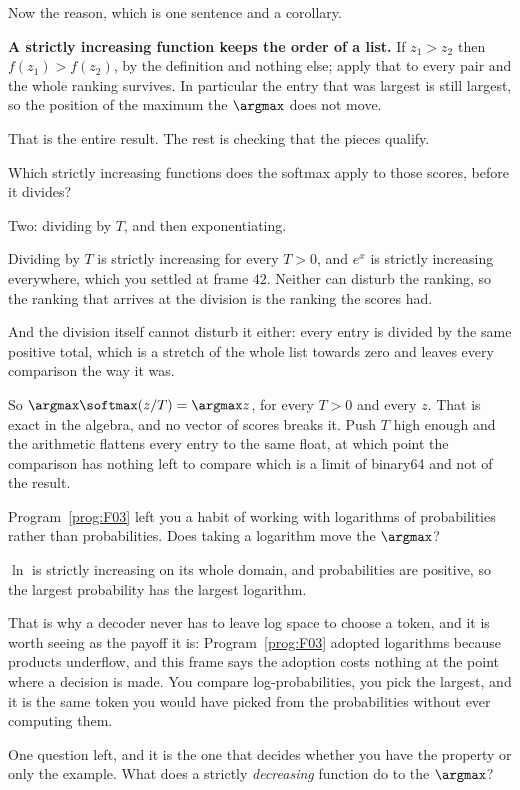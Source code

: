 \begin{fr}
Now the reason, which is one sentence and a corollary.

\textbf{A strictly increasing function keeps the order of a list.} If
$z_1 > z_2$ then $f(z_1) > f(z_2)$, by the definition and nothing else; apply
that to every pair and the whole ranking survives. In particular the entry that
was largest is still largest, so the position of the maximum \dash{} the
$\argmax$ \dash{} does not move.

That is the entire result. The rest is checking that the pieces qualify.

Which strictly increasing functions does the softmax apply to those scores,
before it divides?
\nextframe
\end{fr}

\begin{fr}
\begin{ansblock}
Two: dividing by $T$, and then exponentiating.
\end{ansblock}

Dividing by $T$ is strictly increasing for every $T > 0$, and $e^{x}$ is
strictly increasing everywhere, which you settled at frame $42$. Neither can
disturb the ranking, so the ranking that arrives at the division is the ranking
the scores had.

And the division itself cannot disturb it either: every entry is divided by the
same positive total, which is a stretch of the whole list towards zero and
leaves every comparison the way it was.

So $\argmax \softmax(z / T) = \argmax z$, for every $T > 0$ and every $z$. That
is exact in the algebra, and no vector of scores breaks it. Push $T$ high
enough and the arithmetic flattens every entry to the same float, at which
point the comparison has nothing left to compare \dash{} which is a limit of
binary64 and not of the result.

Program~\ref{prog:F03} left you a habit of working with logarithms of
probabilities rather than probabilities. Does taking a logarithm move the
$\argmax$?
\nextframe
\end{fr}

\begin{fr}
$\ln$ is strictly increasing on its whole domain, and probabilities are
positive, so the largest probability has the largest logarithm.

That is why a decoder never has to leave log space to choose a token, and it is
worth seeing as the payoff it is: Program~\ref{prog:F03} adopted logarithms
because products underflow, and this frame says the adoption costs nothing at
the point where a decision is made. You compare log-probabilities, you pick the
largest, and it is the same token you would have picked from the
probabilities \dash{} without ever computing them.

One question left, and it is the one that decides whether you have the
property or only the example. What does a strictly \emph{decreasing} function
do to the $\argmax$?
\nextframe
\end{fr}

